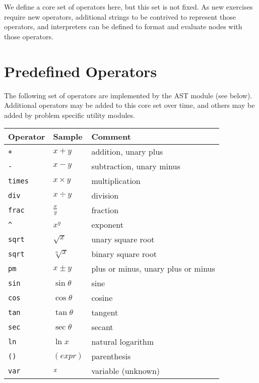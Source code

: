 \documentclass{article}
\newcommand{\var}[1]{\emph{#1}}
\begin{document}
We define a core set of operators here, but this set is not fixed. As new exercises require new 
operators, additional strings to be contrived to represent those operators, and interpreters can be 
defined to format and evaluate nodes with those operators.

\section{Predefined Operators}

The following set of operators are implemented by the AST module (see below). Additional operators
may be added to this core set over time, and others may be added by problem specific utility 
modules.

\vspace{20pt}

\begin{tabular}{ | l | l | p{10cm} |}
\hline
{\bf Operator}& {\bf Sample}   & {\bf Comment} \\ \hline
\verb'+'      & $x+y$          & addition, unary plus\\ \hline
\verb'-'      & $x-y$          & subtraction, unary minus\\ \hline
\verb'times'  & $x \times y$   & multiplication\\ \hline
\verb'div'    & $x \div y$     & division\\ \hline
\verb'frac'   & $\frac{x}{y}$  & fraction\\ \hline
\verb'^'      & $x^y$          & exponent\\ \hline
\verb'sqrt'   & $\sqrt{x}$     & unary square root\\ \hline
\verb'sqrt'   & $\sqrt[n]{x}$  & binary square root\\ \hline
\verb'pm'     & $x \pm y$      & plus or minus, unary plus or minus\\ \hline
\verb'sin'    & $\sin{\theta}$ & sine\\ \hline
\verb'cos'    & $\cos{\theta}$ & cosine\\ \hline
\verb'tan'    & $\tan{\theta}$ & tangent\\ \hline
\verb'sec'    & $\sec{\theta}$ & secant\\ \hline
\verb'ln'     & $\ln{x}$       & natural logarithm\\ \hline
\verb'()'     & $(expr)$       & parenthesis\\ \hline
\verb'var'    & $\var{x}$      & variable (unknown)\\ \hline
\end{tabular}
\end{document}
